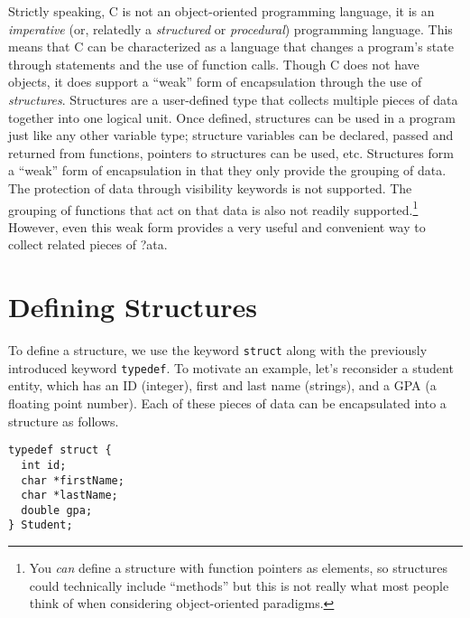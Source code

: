

Strictly speaking, C is not an object-oriented programming language, 
it is an \emph{imperative} (or, relatedly a \emph{structured} or 
\emph{procedural}) programming language.  This means that C can be 
characterized as a language that changes a program's state through statements
and the use of function calls.  Though C does not have objects, it
does support a ``weak'' form of encapsulation through the use
of \emph{structures}.  Structures are a user-defined type that 
collects multiple pieces of data together into one logical unit.
Once defined, structures can be used in a program just like any
other variable type; structure variables can be declared, passed and returned
from functions, pointers to structures can be used, etc.
Structures form a ``weak'' form of encapsulation in that they only
provide the grouping of data.  The protection of data through 
visibility keywords is not supported.  The grouping of functions
that act on that data is also not readily supported.\footnote{You
\emph{can} define a structure with function pointers as elements, 
so structures could technically include ``methods'' but this is
not really what most people think of when considering object-oriented
paradigms.}  However, even this weak form provides a very useful
and convenient way to collect related pieces of \(  \)?ata.

\section{Defining Structures}

To define a structure, we use the keyword \texttt{struct}
along with the previously introduced keyword \texttt{typedef}.
To motivate an example, let's reconsider a student entity, which
has an ID (integer), first and last name (strings), and a GPA 
(a floating point number).  Each of these pieces of data can be
encapsulated into a structure as follows.

\begin{verbatim}
typedef struct {
  int id;
  char *firstName;
  char *lastName;
  double gpa;
} Student;
\end{verbatim}

